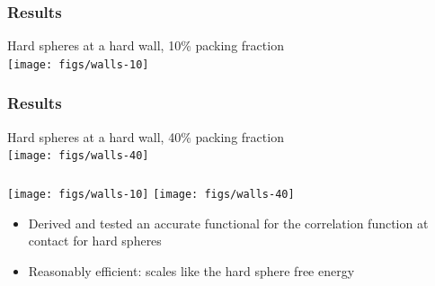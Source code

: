 \begin{frame}
  \frametitle{Results}
  \begin{center}
    Hard spheres at a hard wall, 10\% packing fraction\\
    \texttt{[image: figs/walls-10]}
  \end{center}
\end{frame}

\begin{frame}
  \frametitle{Results}
  \begin{center}
    Hard spheres at a hard wall, 40\% packing fraction\\
    \texttt{[image: figs/walls-40]}
  \end{center}
\end{frame}

\begin{frame}
  \frametitle{\conclude}
  \begin{center}
    \texttt{[image: figs/walls-10]}
    \texttt{[image: figs/walls-40]}
  \end{center}
  \begin{itemize}
  \item Derived and tested an accurate functional for the correlation
    function at contact for hard spheres
  \item Reasonably efficient: scales like the hard sphere free energy
  \end{itemize}
\end{frame}
